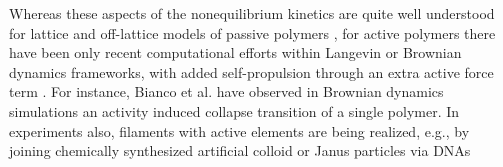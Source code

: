 \documentclass[aps,prx,reprint,showpacs,showkeys,noeprint,longbibliography]{revtex4-1} %
\begin{document}
\par
Whereas these aspects of the nonequilibrium kinetics are quite well understood for lattice and off-lattice models of passive polymers \cite{majumder1, christiansen, majumder3, majumder4,byrne,guo,montesi,bunin}, for active polymers there have been only recent computational efforts within Langevin or Brownian dynamics frameworks, with added self-propulsion through an extra active force term \cite{holder, duman, ravi, kaiser, bianco, 
	sarkar,paul_soft20}. For instance, Bianco et al. \cite{bianco} have observed in Brownian dynamics simulations an activity induced collapse transition of a single polymer.
In experiments also, filaments with active elements are being realized, e.g., 
by joining chemically synthesized artificial colloid or Janus particles via DNAs
\end{document}
